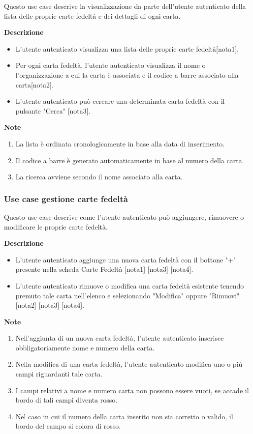 \documentclass[a4paper,12pt]{article}
\begin{document}
Questo use case descrive la visualizzazione da parte dell'utente autenticato della lista delle proprie carte fedeltà e dei dettagli di ogni carta.

\textbf{Descrizione}
\begin{itemize} \setlength\itemsep{0.01em}
\item L'utente autenticato visualizza una lista delle proprie carte fedeltà[nota1].
\item Per ogni carta fedeltà, l'utente autenticato visualizza il nome o l'organizzazione a cui la carta è associata e il codice a barre associato alla carta[nota2].
\item L'utente autenticato può cercare una determinata carta fedeltà con il pulsante "Cerca" [nota3].
\end{itemize}

\textbf{Note}
\begin{enumerate} \setlength\itemsep{0.01em}
\item La lista è ordinata cronologicamente in base alla data di inserimento.
\item Il codice a barre è generato automaticamente in base al numero della carta.
\item La ricerca avviene secondo il nome associato alla carta.
\end{enumerate}


\subsubsection*{Use case gestione carte fedeltà}

 Questo use case descrive come l'utente autenticato può aggiungere, rimuovere o modificare le proprie carte fedeltà.
 
\textbf{Descrizione}
\begin{itemize} \setlength\itemsep{0.01em}
\item L'utente autenticato aggiunge una nuova carta fedeltà con il bottone "+" presente nella scheda Carte Fedeltà [nota1] [nota3] [nota4].
\item L'utente autenticato rimuove o modifica una carta fedeltà esistente tenendo premuto tale carta nell'elenco e selezionando "Modifica" oppure "Rimuovi" [nota2] [nota3] [nota4].
\end{itemize}

\textbf{Note}
\begin{enumerate} \setlength\itemsep{0.01em}
\item Nell'aggiunta di un nuova carta fedeltà, l'utente autenticato inserisce obbligatoriamente nome e numero della carta.
\item Nella modifica di una carta fedeltà, l'utente autenticato modifica uno o più campi riguardanti tale carta.
\item I campi relativi a nome e numero carta non possono essere vuoti, se accade il bordo di tali campi diventa rosso.
\item Nel caso in cui il numero della carta inserito non sia corretto o valido, il bordo del campo si colora di rosso.
\end{enumerate}
\end{document}
